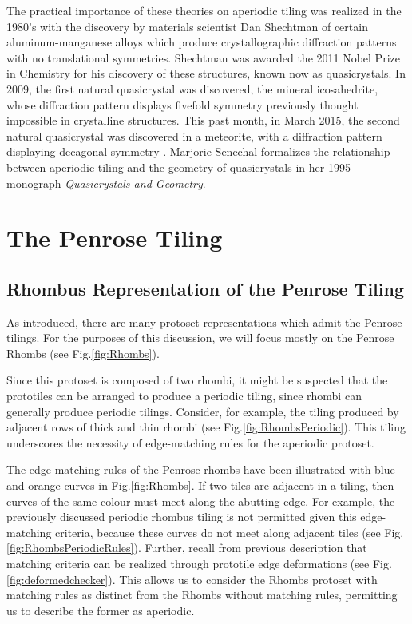 \documentclass[]{article}
\begin{document}
The practical importance of these theories on aperiodic tiling was realized in the 1980's with the discovery by materials scientist Dan Shechtman of certain aluminum-manganese alloys which produce crystallographic diffraction patterns with no translational symmetries. Shechtman was awarded the 2011 Nobel Prize in Chemistry for his discovery of these structures, known now as quasicrystals. In 2009, the first natural quasicrystal was discovered, the mineral icosahedrite, whose diffraction pattern displays fivefold symmetry previously thought impossible in crystalline structures. This past month, in March 2015, the second natural quasicrystal was discovered in a meteorite, with a diffraction pattern displaying decagonal symmetry \cite{Bindi2015}. Marjorie Senechal formalizes the relationship between aperiodic tiling and the geometry of quasicrystals in her 1995 monograph \textit{Quasicrystals and Geometry}. 


\section{The Penrose Tiling}
\subsection{Rhombus Representation of the Penrose Tiling}
As introduced, there are many protoset representations which admit the Penrose tilings. For the purposes of this discussion, we will focus mostly on the Penrose Rhombs (see Fig.\ref{fig:Rhombs}). 

Since this protoset is composed of two rhombi, it might be suspected that the prototiles can be arranged to produce a periodic tiling, since rhombi can generally produce periodic tilings. Consider, for example, the tiling produced by adjacent rows of thick and thin rhombi (see Fig.\ref{fig:RhombsPeriodic}). This tiling underscores the necessity of edge-matching rules for the aperiodic protoset. 

The edge-matching rules of the Penrose rhombs have been illustrated with blue and orange curves in Fig.\ref{fig:Rhombs}. If two tiles are adjacent in a tiling, then curves of the same colour must meet along the abutting edge. For example, the previously discussed periodic rhombus tiling is not permitted given this edge-matching criteria, because these curves do not meet along adjacent tiles (see Fig.\ref{fig:RhombsPeriodicRules}). Further, recall from previous description that matching criteria can be realized through prototile edge deformations (see Fig.\ref{fig:deformedchecker}). This allows us to consider the Rhombs protoset with matching rules as distinct from the Rhombs without matching rules, permitting us to describe the former as aperiodic. 
\end{document}
